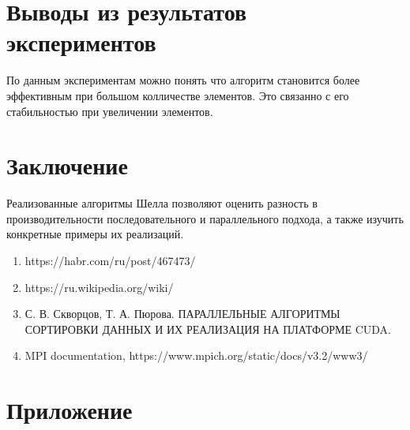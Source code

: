 \documentclass{report}
\begin{document}
\newpage

\section*{Выводы из результатов экспериментов}
По данным экспериментам можно понять что алгоритм становится более эффективным при большом колличестве элементов. Это связанно с его стабильностью при увеличении элементов.

\newpage
\section*{Заключение}
Реализованные алгоритмы Шелла позволяют оценить разность в производительности последовательного и параллельного подхода, а также изучить конкретные примеры их реализаций.
\newpage


\begin{enumerate}
\item https://habr.com/ru/post/467473/
\item https://ru.wikipedia.org/wiki/%


\item С. В. Скворцов, Т. А. Пюрова. ПАРАЛЛЕЛЬНЫЕ АЛГОРИТМЫ СОРТИРОВКИ ДАННЫХ
И ИХ РЕАЛИЗАЦИЯ НА ПЛАТФОРМЕ CUDA.

\item MPI documentation, https://www.mpich.org/static/docs/v3.2/www3/
\end{enumerate}
\newpage
\section*{Приложение}
\end{document}
